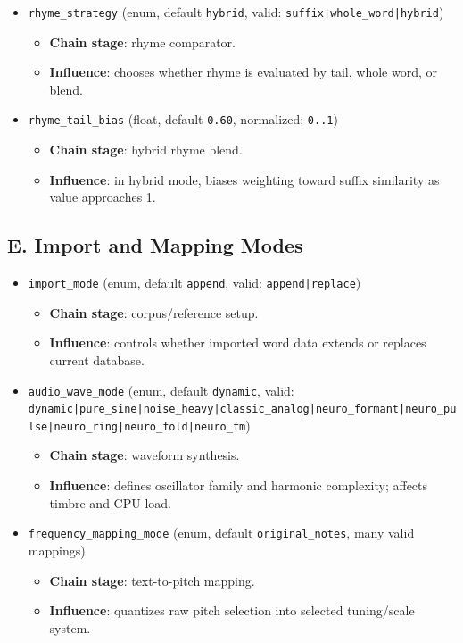 \documentclass[11pt,a4paper]{article}
\begin{document}
\begin{itemize}
  \item \texttt{rhyme\_strategy} (enum, default \texttt{hybrid}, valid: \texttt{suffix|whole\_word|hybrid})
  \begin{itemize}
    \item \textbf{Chain stage}: rhyme comparator.
    \item \textbf{Influence}: chooses whether rhyme is evaluated by tail, whole word, or blend.
  \end{itemize}

  \item \texttt{rhyme\_tail\_bias} (float, default \texttt{0.60}, normalized: \texttt{0..1})
  \begin{itemize}
    \item \textbf{Chain stage}: hybrid rhyme blend.
    \item \textbf{Influence}: in hybrid mode, biases weighting toward suffix similarity as value approaches 1.
  \end{itemize}
\end{itemize}

\subsection*{E. Import and Mapping Modes}
\begin{itemize}
  \item \texttt{import\_mode} (enum, default \texttt{append}, valid: \texttt{append|replace})
  \begin{itemize}
    \item \textbf{Chain stage}: corpus/reference setup.
    \item \textbf{Influence}: controls whether imported word data extends or replaces current database.
  \end{itemize}

  \item \texttt{audio\_wave\_mode} (enum, default \texttt{dynamic}, valid: \texttt{dynamic|pure\_sine|noise\_heavy|classic\_analog|neuro\_formant|neuro\_pulse|neuro\_ring|neuro\_fold|neuro\_fm})
  \begin{itemize}
    \item \textbf{Chain stage}: waveform synthesis.
    \item \textbf{Influence}: defines oscillator family and harmonic complexity; affects timbre and CPU load.
  \end{itemize}

  \item \texttt{frequency\_mapping\_mode} (enum, default \texttt{original\_notes}, many valid mappings)
  \begin{itemize}
    \item \textbf{Chain stage}: text-to-pitch mapping.
    \item \textbf{Influence}: quantizes raw pitch selection into selected tuning/scale system.
  \end{itemize}
\end{itemize}
\end{document}
